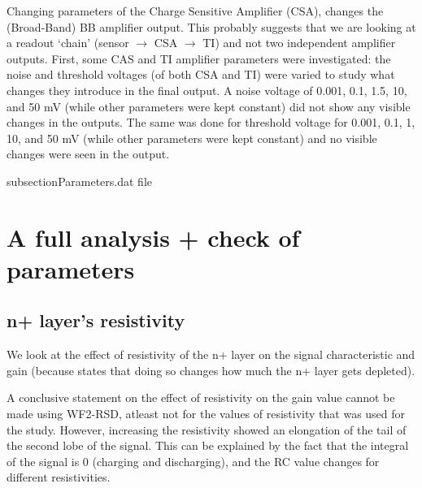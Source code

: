 \documentclass[11pt]{article}
\begin{document}
Changing parameters of the Charge Sensitive Amplifier (CSA), changes the (Broad-Band) BB amplifier output. This probably suggests that we are looking at a readout `chain' (sensor $\rightarrow$ CSA $\rightarrow$ TI) and not two independent amplifier outputs.
\newline
First, some CAS and TI amplifier parameters were investigated: the noise and threshold voltages (of both CSA and TI) were varied to study what changes they introduce in the final output. A noise voltage of 0.001, 0.1, 1.5, 10, and 50 mV (while other parameters were kept constant) did not show any visible changes in the outputs. The same was done for threshold voltage for 0.001, 0.1, 1, 10, and 50 mV (while other parameters were kept constant) and no visible changes were seen in the output.

subsection{Parameters.dat file}

\section{A full analysis + check of parameters}
\subsection{n+ layer's resistivity}
We look at the effect of resistivity of the n+ layer on the signal characteristic and gain (because \cite{giacomini-lgad} states that doing so changes how much the n+ layer gets depleted).

A conclusive statement on the effect of resistivity on the gain value cannot be made using WF2-RSD, atleast not for the values of resistivity that was used for the study. However, increasing the resistivity showed an elongation of the tail of the second lobe of the signal. This can be explained by the fact that the integral of the signal is 0 (charging and discharging), and the RC value changes for different resistivities.
\end{document}
